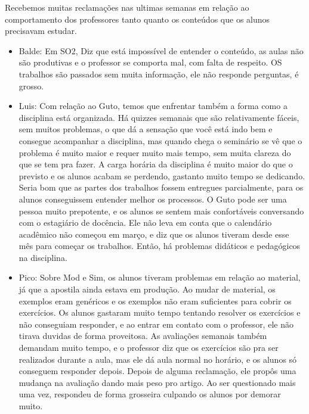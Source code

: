 \documentclass{ata-calico}
\begin{document}
\maketitle


Recebemos muitas reclamações nas ultimas semanas em relação ao comportamento dos professores tanto quanto os conteúdos que os alunos precisavam estudar. 
\begin{itemize}
\item Balde: Em SO2, Diz que está impossível de entender o conteúdo, as aulas não são produtivas e o professor se comporta mal, com falta de respeito. OS trabalhos são passados sem muita informação, ele não responde perguntas, é grosso. 

\item Luis: Com relação ao Guto, temos que enfrentar também a forma como a disciplina está organizada. Há quizzes semanais que são relativamente fáceis, sem muitos problemas, o que dá a sensação que você está indo bem e consegue acompanhar a disciplina, mas quando chega o seminário se vê que o problema é muito maior e requer muito mais tempo, sem muita clareza do que se tem pra fazer. A carga horária da disciplina é muito maior do que o previsto e os alunos acabam se perdendo, gastanto muito tempo se dedicando. Seria bom que as partes dos trabalhos fossem entregues parcialmente, para os alunos conseguissem entender melhor os processos. O Guto pode ser uma pessoa muito prepotente, e os alunos se sentem mais confortáveis conversando com o estagiário de docência. Ele não leva em conta que o calendário acadêmico não começou em março, e diz que os alunos tiveram desde esse mês para começar os trabalhos. Então, há problemas didáticos e pedagógicos na disciplina.

\item Pico: Sobre Mod e Sim, os alunos tiveram problemas em relação ao material, já que a apostila ainda estava em produção. Ao mudar de material, os exemplos eram genéricos e os  exemplos não eram suficientes para cobrir os exercícios. Os alunos gastaram muito tempo tentando resolver os exercícios e não conseguiam responder, e ao entrar em contato com o professor, ele não tirava duvidas de forma proveitosa. As avaliações semanais também demandam muito tempo, e o professor diz que os exercícios são pra ser realizados durante a aula, mas ele dá aula normal no horário, e os alunos só conseguem responder depois. Depois de alguma reclamação, ele propôs uma mudança na avaliação dando mais peso pro artigo. Ao ser questionado mais uma vez, respondeu de forma grosseira culpando os alunos por demorar muito.


\end{itemize}
\end{document}
